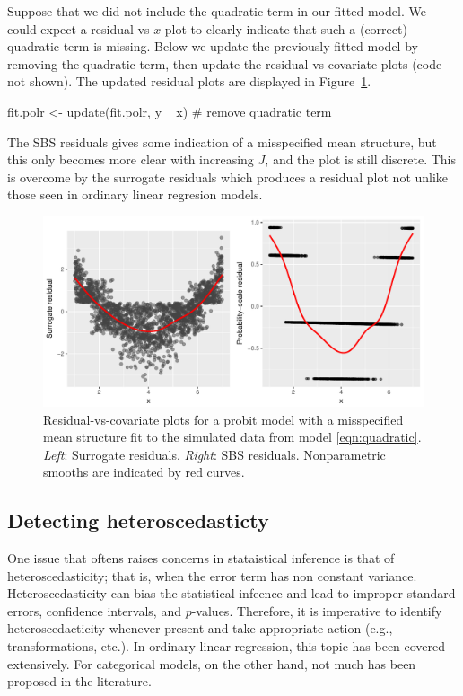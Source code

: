 Suppose that we did not include the quadratic term in our fitted model. We could expect a residual-vs-$x$ plot to clearly indicate that such a (correct) quadratic term is missing. Below we update the previously fitted model by removing the quadratic term, then update the residual-vs-covariate plots (code not shown). The updated residual plots are displayed in Figure~\ref{fig:quadratic}.
\begin{example}
fit.polr <- update(fit.polr, y ~ x)  # remove quadratic term
\end{example}
The SBS residuals gives some indication of a misspecified mean structure, but this only becomes more clear with increasing $J$, and the plot is still discrete. This is overcome by the surrogate residuals which produces a residual plot not unlike those seen in ordinary linear regresion models.

\begin{figure}[!htbp]
  \centering
  \includegraphics[width=1\textwidth]{quadratic}
  \caption{Residual-vs-covariate plots for a probit model with a misspecified mean structure fit to the simulated data from model \eqref{eqn:quadratic}. \textit{Left}: Surrogate residuals. \textit{Right}: SBS residuals. Nonparametric smooths are indicated by red curves.}
  \label{fig:quadratic}
\end{figure}


\subsection{Detecting heteroscedasticty}

One issue that oftens raises concerns in  stataistical inference is that of heteroscedasticity; that is, when the error term has non constant variance. Heteroscedasticity can bias the statistical infeence and lead to improper standard errors, confidence intervals, and $p$-values. Therefore, it is imperative to identify heteroscedacticity whenever present and take appropriate action (e.g., transformations, etc.). In ordinary linear regression, this topic has been covered extensively. For categorical models, on the other hand, not much has been proposed in the literature.

